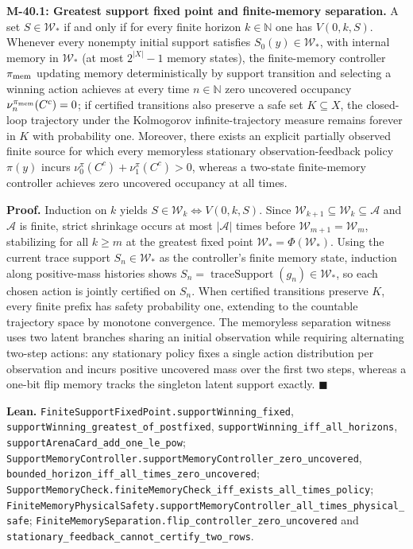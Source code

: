 \documentclass[
  english,
  11pt,
  oneside]{book}
\newcounter{none} %
\begin{document}
\hypertarget{m-40-1}{}\label{m-40-1}

\textbf{M-40.1: Greatest support fixed point and finite-memory separation.} A set \(S\in\mathcal W_*\) if and only if for every finite horizon \(k\in\mathbb N\) one has \(V(0,k,S)\). Whenever every nonempty initial support satisfies \(S_0(y)\in\mathcal W_*\), with internal memory in \(\mathcal W_*\) (at most \(2^{|X|}-1\) memory states), the finite-memory controller \(\pi_{\rm mem}\) updating memory deterministically by support transition and selecting a winning action achieves at every time \(n\in\mathbb N\) zero uncovered occupancy \(\nu_n^{\pi_{\rm mem}}(C^c)=0\); if certified transitions also preserve a safe set \(K\subseteq X\), the closed-loop trajectory under the Kolmogorov infinite-trajectory measure remains forever in \(K\) with probability one. Moreover, there exists an explicit partially observed finite source for which every memoryless stationary observation-feedback policy \(\pi(y)\) incurs \(\nu_0^\pi(C^c)+\nu_1^\pi(C^c)>0\), whereas a two-state finite-memory controller achieves zero uncovered occupancy at all times.

\textbf{Proof.} Induction on \(k\) yields \(S\in\mathcal W_k\iff V(0,k,S)\). Since \(\mathcal W_{k+1}\subseteq\mathcal W_k\subseteq\mathcal A\) and \(\mathcal A\) is finite, strict shrinkage occurs at most \(|\mathcal A|\) times before \(\mathcal W_{m+1}=\mathcal W_m\), stabilizing for all \(k\ge m\) at the greatest fixed point \(\mathcal W_*=\Phi(\mathcal W_*)\). Using the current trace support \(S_n\in\mathcal W_*\) as the controller's finite memory state, induction along positive-mass histories shows \(S_n=\operatorname{traceSupport}(g_n)\in\mathcal W_*\), so each chosen action is jointly certified on \(S_n\). When certified transitions preserve \(K\), every finite prefix has safety probability one, extending to the countable trajectory space by monotone convergence. The memoryless separation witness uses two latent branches sharing an initial observation while requiring alternating two-step actions: any stationary policy fixes a single action distribution per observation and incurs positive uncovered mass over the first two steps, whereas a one-bit flip memory tracks the singleton latent support exactly. \(\blacksquare\)

\textbf{Lean.} \nolinkurl{FiniteSupportFixedPoint.supportWinning_fixed}, \nolinkurl{supportWinning_greatest_of_postfixed}, \nolinkurl{supportWinning_iff_all_horizons}, \nolinkurl{supportArenaCard_add_one_le_pow}; \nolinkurl{SupportMemoryController.supportMemoryController_zero_uncovered}, \nolinkurl{bounded_horizon_iff_all_times_zero_uncovered}; \nolinkurl{SupportMemoryCheck.finiteMemoryCheck_iff_exists_all_times_policy}; \nolinkurl{FiniteMemoryPhysicalSafety.supportMemoryController_all_times_physical_safe}; \nolinkurl{FiniteMemorySeparation.flip_controller_zero_uncovered} and \nolinkurl{stationary_feedback_cannot_certify_two_rows}.
\end{document}
